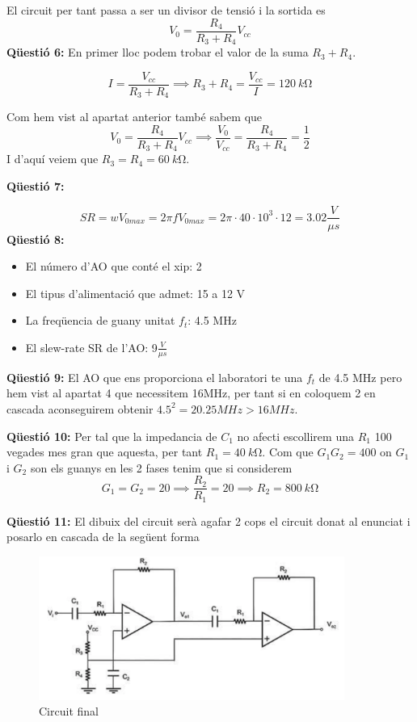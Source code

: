 \documentclass[12pt, a4papre]{article}
\begin{document}
	El circuit per tant passa a ser un divisor de tensió i la sortida es
	\[
		V_0 = \frac{R_4}{R_3 + R_4}V_{cc}
	\]
	\textbf{Qüestió 6: }En primer lloc podem trobar el valor de la suma $R_3 + R_4$.
	
	\[
		I = \frac{V_{cc}}{R_3 + R_4} \implies R_3 + R_4 = \frac{V_{cc}}{I} = \SI{120}{k\ohm}
	\]
	
	Com hem vist al apartat anterior també sabem que 
	\[
		V_0 = \frac{R_4}{R_3 + R_4}V_{cc} \implies \frac{V_0}{V_{cc}} = \frac{R_4}{R_3 + R_4} = \frac{1}{2}
	\]
	I d'aquí veiem que $R_3 = R_4 = \SI{60}{k\ohm}$.
	
	\textbf{Qüestió 7: } 
	
	\[
		SR = wV_{0 max} = 2\pi fV_{0 max} = 2\pi\cdot 40 \cdot 10^3 \cdot 12 = 3.02 \frac{V}{\mu s}
	\]
	\newpage
	\textbf{Qüestió 8: } 
	\begin{itemize}
		\item El número d'AO que conté el xip: 2
		\item El tipus d'alimentació que admet: 15 a 12 V
		\item La freqüencia de guany unitat $f_t$: 4.5 MHz
		\item El slew-rate SR de l'AO: 9$ \frac{V}{\mu s}$
	\end{itemize}
	
	\textbf{Qüestió 9: }El AO que ens proporciona el laboratori te una $f_t$ de 4.5 MHz pero hem vist al apartat 4 que necessitem 16MHz, per tant si en coloquem 2 en cascada aconseguirem obtenir $4.5^2 = 20.25 MHz > 16 MHz$.
	
	\textbf{Qüestió 10: }Per tal que la impedancia de $C_1$ no afecti escollirem una $R_1$ 100 vegades mes gran que aquesta, per tant $R_1 = \SI{40}{k\ohm}$. Com que $G_1G_2 = 400$ on $G_1$ i $G_2$ son els guanys en les 2 fases tenim que si considerem  
	\[
		G_1 = G_2 = 20 \implies \frac{R_2}{R_1} = 20 \implies R_2 = \SI{800}{k\ohm}
	\]
	
	\textbf{Qüestió 11: }El dibuix del circuit serà agafar 2 cops el circuit donat al enunciat i posarlo en cascada de la següent forma
	\begin{figure}[H]
		\begin{center}
		\includegraphics[width=100mm]{previ2_11.png}
		\caption{Circuit final}
		\end{center}
	\end{figure}
	
\end{document}
